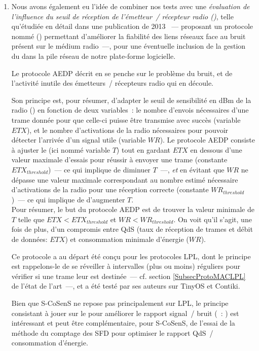 \begin{enumerate}
\item Nous avons également eu l'idée de combiner nos tests avec une
\emph{évaluation de l'influence du seuil de réception de l'émetteur~/
récepteur radio ()}, telle qu'étudiée en détail
dans une publication de 2013 \cite{CCAThresholdStudy}~--- proposant un
protocole nommé  ()
permettant d'améliorer la fiabilité des liens réseaux face au bruit
présent sur le médium radio~---, pour une éventuelle inclusion de la
gestion du  dans la pile réseau de notre
plate-forme logicielle.

Le protocole AEDP décrit en \cite{CCAThresholdStudy} se penche sur
le problème du bruit, et de l'activité inutile des émetteurs~/ récepteurs
radio qui en découle.

Son principe est, pour résumer, d'adapter le seuil de sensibilité en dBm
de la radio () en fonction de deux variables~:
le nombre d'envois nécessaires d'une trame donnée pour que celle-ci puisse
être transmise avec succès (variable ${ETX}$), et le nombre d'activations
de la radio nécessaires pour pouvoir détecter l'arrivée d'un signal utile
(variable ${WR}$). Le protocole AEDP consiste à ajuster le  (ici nommé variable $T$) tout en gardant $ETX$ en dessous
d'une valeur maximale d'essais pour réussir à envoyer une trame (constante
${ETX}_{threshold}$)~--- ce qui implique de diminuer $T$~---, \emph{et} en
évitant que $WR$ ne dépasse une valeur maximale correspondant au nombre
estimé nécessaire d'activations de la radio pour une réception correcte
(constante ${WR}_{threshold}$)~--- ce qui implique de d'augmenter $T$. \\
Pour résumer, le but du protocole AEDP est de trouver la valeur minimale
de $T$ telle que ${ETX} < {ETX}_{threshold}$ et ${WR} < {WR}_{threshold}$.
On voit qu'il s'agit, une fois de plus, d'un compromis entre QdS (taux
de réception de trames et débit de données: $ETX$) et consommation
minimale d'énergie ($WR$).

Ce protocole a au départ été conçu pour les protocoles LPL, dont le principe
est rappelons-le de se réveiller à intervalles (plus ou moins) réguliers
pour vérifier si une trame leur est destinée~--- cf. section
\vref{SubsecProtoMACLPL} de l'état de l'art~---, et a été testé
par ses auteurs sur TinyOS et Contiki.

Bien que S-CoSenS ne repose pas principalement sur LPL, le principe
consistant à jouer sur le  pour améliorer le
rapport signal~/ bruit (~: ) est
intéressant et peut être complémentaire, pour S-CoSenS, de l'essai
de la méthode du comptage des SFD pour optimiser le rapport QdS~/
consommation d'énergie.


\end{enumerate}
